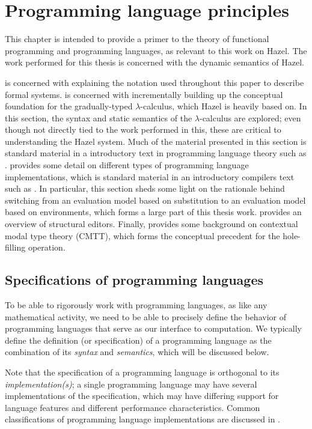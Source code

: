 \chapter{Programming language principles}
\label{sec:prog_lang_principles}

This chapter is intended to provide a primer to the theory of functional programming and programming languages, as relevant to this work on Hazel. The work performed for this thesis is concerned with the dynamic semantics of Hazel.

 is concerned with explaining the notation used throughout this paper to describe formal systems.  is concerned with incrementally building up the conceptual foundation for the gradually-typed $\lambda$-calculus, which Hazel is heavily based on. In this section, the syntax and static semantics of the $\lambda$-calculus are explored; even though not directly tied to the work performed in this, these are critical to understanding the Hazel system. Much of the material presented in this section is standard material in a introductory text in programming language theory such as \cite{harper2016practical}.  provides some detail on different types of programming language implementations, which is standard material in an introductory compilers text such as \cite{aho86}. In particular, this section sheds some light on the rationale behind switching from an evaluation model based on substitution to an evaluation model based on environments, which forms a large part of this thesis work.  provides an overview of structural editors. Finally,  provides some background on contextual modal type theory (CMTT), which forms the conceptual precedent for the hole-filling operation.

\section{Specifications of programming languages}
\label{sec:prog-lang-def}

To be able to rigorously work with programming languages, as like any mathematical activity, we need to be able to precisely define the behavior of programming languages that serve as our interface to computation. We typically define the definition (or specification) of a programming language as the combination of its \textit{syntax} and \textit{semantics}, which will be discussed below.

Note that the specification of a programming language is orthogonal to its \textit{implementation(s)}; a single programming language may have several implementations of the specification, which may have differing support for language features and different performance characteristics. Common classifications of programming language implementations are discussed in .

